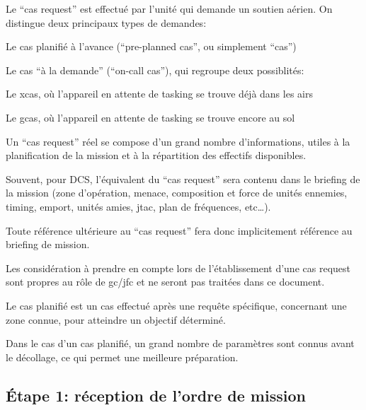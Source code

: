 \e
    \item Le ``\gls{cas} request'' est effectué par l'unité qui demande un soutien aérien. On distingue deux principaux types de demandes:
    \ee
        \item Le \gls{cas} planifié à l'avance (``pre-planned \gls{cas}'', ou simplement ``\gls{cas}'')
        \item Le \gls{cas} ``à la demande'' (``on-call cas''), qui regroupe deux possiblités:
        \eee
            \item Le \gls{xcas}, où l'appareil en attente de tasking se trouve déjà dans les airs
            \item Le \gls{gcas}, où l'appareil en attente de tasking se trouve encore au sol
        \ed
    \ed
    \item Un ``\gls{cas} request'' réel se compose d'un grand nombre d'informations, utiles à la planification de la mission et à la répartition des effectifs disponibles.
    \item
    Souvent, pour DCS, l'équivalent du ``\gls{cas} request'' sera contenu dans le briefing de la mission (zone d'opération, menace, composition et force de unités ennemies, timing, emport, unités amies, \gls{jtac}, plan de fréquences, etc…).
    \item Toute référence ultérieure au ``\gls{cas} request'' fera donc implicitement référence au briefing de mission.
    \item Les considération à prendre en compte lors de l'établissement d'une \gls{cas} request sont propres au rôle de \gls{gc}/\gls{jfc} et ne seront pas traitées dans ce document.
    \item Le \gls{cas} planifié est un \gls{cas} effectué après une requête spécifique, concernant une zone connue, pour atteindre un objectif déterminé.
    \item Dans le cas d'un \gls{cas} planifié, un grand nombre de paramètres sont connus avant le décollage, ce qui permet une meilleure préparation.
\ed

\subsection{Étape 1: réception de l'ordre de mission}

